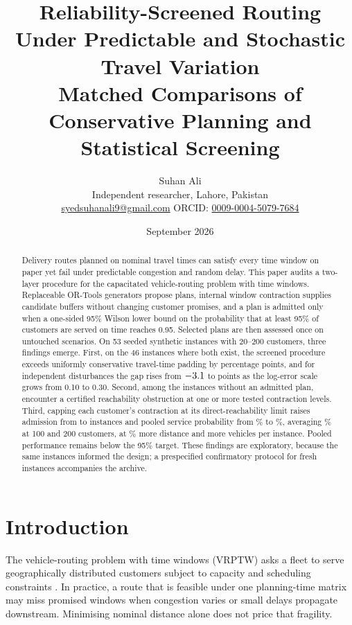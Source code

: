 \documentclass[11pt,a4paper]{article}
\title{Reliability-Screened Routing Under Predictable and Stochastic Travel Variation\\
\large Matched Comparisons of Conservative Planning and Statistical Screening}
\author{Suhan Ali\\[2pt]\small Independent researcher, Lahore, Pakistan\\
\small \href{mailto:syedsuhanali9@gmail.com}{syedsuhanali9@gmail.com}\quad
ORCID: \href{https://orcid.org/0009-0004-5079-7684}{0009-0004-5079-7684}}
\date{September 2026}
\begin{document}
\maketitle

\begin{abstract}
Delivery routes planned on nominal travel times can satisfy every time window
on paper yet fail under predictable congestion and random delay. This paper
audits a two-layer procedure for the capacitated vehicle-routing problem with
time windows. Replaceable OR-Tools generators propose plans, internal window
contraction supplies candidate buffers without changing customer promises,
and a plan is admitted only when a one-sided 95\% Wilson lower bound on the
probability that at least 95\% of customers are served on time reaches 0.95.
Selected plans are then assessed once on untouched scenarios. On 53 seeded
synthetic instances with 20--200 customers, three findings emerge. First, on
the 46 instances where both exist, the screened procedure exceeds uniformly
conservative travel-time padding by \ProcConsRange{} percentage points, and for
independent disturbances the gap rises from $-3.1$ to
\SweepHighIndep{} points as the log-error scale grows from 0.10 to 0.30.
Second, among the \FailureCount{} instances without an admitted plan,
\CertifiedFailures{} encounter a certified reachability obstruction at one or
more tested contraction levels. Third, capping
each customer's contraction at its direct-reachability limit raises admission
from \OriginalSelected{} to \CappedSelected{} instances and pooled service
probability from \OriginalProbability\% to \CappedProbability\%, averaging
\CappedLargeRange\% at 100 and 200 customers, at \CappedDistanceCost\% more
distance and \CappedFleetCost{} more vehicles per instance. Pooled performance
remains below the 95\% target. These findings are exploratory, because the
same instances informed the design; a prespecified confirmatory protocol for
fresh instances accompanies the archive.
\end{abstract}

\section{Introduction}

The vehicle-routing problem with time windows (VRPTW) asks a fleet to serve
geographically distributed customers subject to capacity and scheduling
constraints \cite{solomon1987,toth2014}. In practice, a route that is feasible
under one planning-time matrix may miss promised windows when congestion varies
or small delays propagate downstream. Minimising nominal distance alone does
not price that fragility.
\end{document}
